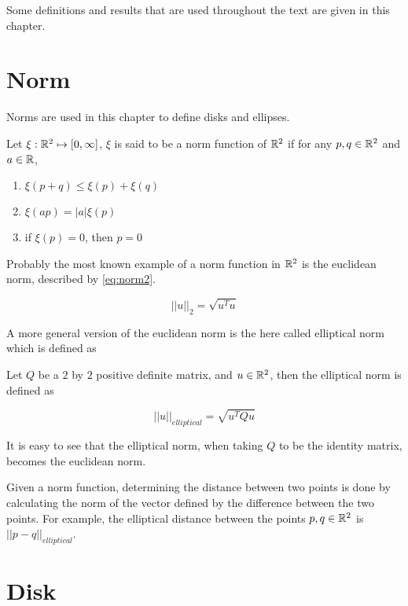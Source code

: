 Some definitions and results that are used throughout the text are given in this chapter.

\section{Norm}

Norms are used in this chapter to define disks and ellipses.

\begin{definicao}
Let $\xi : \mathbb{R}^2 \mapsto [0, \infty]$, $\xi$ is said to be a norm function of $\mathbb{R}^2$ if for any $p, q \in \mathbb{R}^2$ and $a \in \mathbb{R}$,

\begin{enumerate}
    \item $\xi(p + q) \le \xi(p) + \xi(q)$
    \item $\xi(ap) = |a|\xi(p)$
    \item if $\xi(p)=0$, then $p=0$
\end{enumerate}

\end{definicao}

Probably the most known example of a norm function in $\mathbb{R}^2$ is the euclidean norm, described by \autoref{eq:norm2}.

\begin{equation}\label{eq:norm2}
||u||_2 = \sqrt{u^{T}u}
\end{equation}

A more general version of the euclidean norm is the here called elliptical norm which is defined as

\begin{definicao}
Let $Q$ be a $2$ by $2$ positive definite matrix, and $u \in \mathbb{R}^2$, then the elliptical norm is defined as

\begin{equation}
||u||_{elliptical} = \sqrt{u^{T}Qu}
\end{equation}
\end{definicao}

It is easy to see that the elliptical norm, when taking $Q$ to be the identity matrix, becomes the euclidean norm.

Given a norm function, determining the distance between two points is done by calculating the norm of the vector defined by the difference between the two points. For example, the elliptical distance between the points $p,q \in \mathbb{R}^2$ is $||p-q||_{elliptical}$.

\section{Disk}

